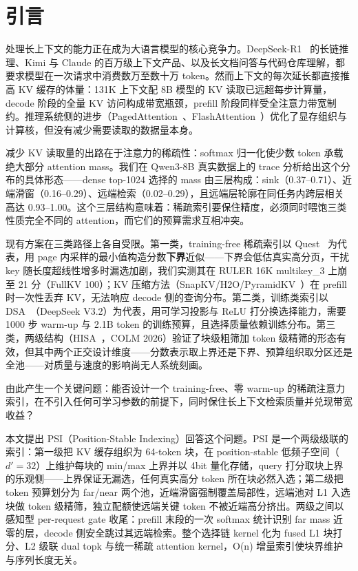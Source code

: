 \documentclass[11pt]{article}
\begin{document}
\section{引言}

处理长上下文的能力正在成为大语言模型的核心竞争力。DeepSeek-R1~\cite{dsr1} 的长链推理、Kimi 与 Claude 的百万级上下文产品、以及长文档问答与代码仓库理解，都要求模型在一次请求中消费数万至数十万 token。然而上下文的每次延长都直接推高 KV 缓存的体量：131K 上下文配 8B 模型的 KV 读取已远超每步计算量，decode 阶段的全量 KV 访问构成带宽瓶颈，prefill 阶段同样受全注意力带宽制约。推理系统侧的进步（PagedAttention~\cite{vllm}、FlashAttention~\cite{fa}）优化了显存组织与计算核，但没有减少需要读取的数据量本身。

减少 KV 读取量的出路在于注意力的稀疏性：softmax 归一化使少数 token 承载绝大部分 attention mass。我们在 Qwen3-8B 真实数据上的 trace 分析给出这个分布的具体形态——dense top-1024 选择的 mass 由三层构成：sink（0.37--0.71）、近端滑窗（0.16--0.29）、远端检索（0.02--0.29），且远端层轮廓在同任务内跨层相关高达 0.93--1.00。这个三层结构意味着：稀疏索引要保住精度，必须同时喂饱三类性质完全不同的 attention，而它们的预算需求互相冲突。

现有方案在三类路径上各自受限。第一类，training-free 稀疏索引以 Quest~\cite{quest} 为代表，用 page 内采样的最小值构造分数\textbf{下界}近似——下界会低估真实高分页，干扰 key 随长度超线性增多时漏选加剧，我们实测其在 RULER 16K multikey\_3 上崩至 21 分（FullKV 100）；KV 压缩方法（SnapKV/H2O/PyramidKV~\cite{snapkv,h2o,pyramidkv}）在 prefill 时一次性丢弃 KV，无法响应 decode 侧的查询分布。第二类，训练类索引以 DSA~\cite{dsa}（DeepSeek V3.2）为代表，用可学习投影与 ReLU 打分换选择能力，需要 1000 步 warm-up 与 2.1B token 的训练预算，且选择质量依赖训练分布。第三类，两级结构（HISA~\cite{hisa}，COLM 2026）验证了块级粗筛加 token 级精筛的形态有效，但其中两个正交设计维度——分数表示取上界还是下界、预算组织取分区还是全池——对质量与速度的影响尚无人系统刻画。

由此产生一个关键问题：能否设计一个 training-free、零 warm-up 的稀疏注意力索引，在不引入任何可学习参数的前提下，同时保住长上下文检索质量并兑现带宽收益？

本文提出 PSI（Position-Stable Indexing）回答这个问题。PSI 是一个两级级联的索引：第一级把 KV 缓存组织为 64-token 块，在 position-stable 低频子空间（$d'{=}32$）上维护每块的 min/max 上界并以 4bit 量化存储，query 打分取块上界的乐观侧——上界保证无漏选，任何真实高分 token 所在块必然入选；第二级把 token 预算划分为 far/near 两个池，近端滑窗强制覆盖局部性，远端池对 L1 入选块做 token 级精筛，独立配额使远端关键 token 不被近端高分挤出。两级之间以感知型 per-request gate 收尾：prefill 末段的一次 softmax 统计识别 far mass 近零的层，decode 侧安全跳过其远端检索。整个选择链 kernel 化为 fused L1 块打分、L2 级联 dual topk 与统一稀疏 attention kernel，O(n) 增量索引使块界维护与序列长度无关。
\end{document}
